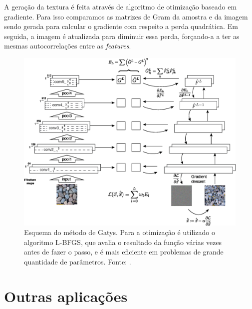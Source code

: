 A geração da textura é feita através de algoritmo
de otimização baseado em gradiente. Para isso
comparamos as matrizes de Gram da amostra e da
imagem sendo gerada para calcular o gradiente
com respeito a perda quadrática. Em seguida,
a imagem é atualizada para diminuir essa perda,
forçando-a a ter as mesmas autocorrelações entre
as \textit{features}.

\begin{figure}[!ht]
	\centering
	\includegraphics[width=\linewidth*2/3]{files/assets/articles/gatys2.png}
	\caption{Esquema do método de Gatys. Para a otimização
		é utilizado o algoritmo L-BFGS, 
		que avalia o resultado da função
		várias vezes antes de fazer o passo,
		e é mais eficiente em problemas de grande quantidade
		de parâmetros. Fonte: \cite{Gatys2015}.}
	\label{img:preview}
\end{figure}


 






\iftrue
\chapter{Outras aplicações}

